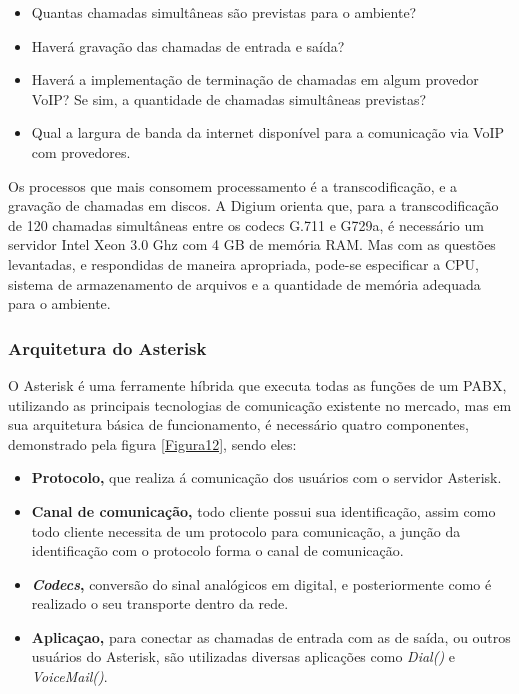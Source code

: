 \begin{itemize}
  \item Quantas chamadas simultâneas são previstas para o ambiente?
  \item Haverá gravação das chamadas de entrada e saída?
  \item Haverá a implementação de terminação de chamadas em algum provedor VoIP? Se sim, a quantidade de chamadas simultâneas previstas?
  \item Qual a largura de banda da internet disponível para a comunicação via VoIP com provedores.
\end{itemize}

Os processos que mais consomem processamento é a transcodificação, e a gravação de chamadas em discos. A Digium orienta que, para a transcodificação de 120 chamadas simultâneas entre os codecs G.711 e G729a, é necessário um servidor Intel Xeon 3.0 Ghz com 4 GB de memória RAM. Mas com as questões levantadas, e respondidas de maneira apropriada, pode-se especificar a CPU, sistema de armazenamento de arquivos e a quantidade de memória adequada para o ambiente. \cite{alexandrekeller2014}

\subsubsection{Arquitetura do Asterisk}
O Asterisk é uma ferramente híbrida que executa todas as funções de um PABX, utilizando as principais tecnologias de comunicação existente no mercado, mas em sua arquitetura básica de funcionamento, é necessário quatro componentes, demonstrado pela figura \ref{Figura12}, sendo eles: \cite{books/daglib/0018909}

\begin{itemize}
  \item \textbf{Protocolo,} que realiza á comunicação dos usuários com o servidor Asterisk.
  \item \textbf{Canal de comunicação,} todo cliente possui sua identificação, assim como todo cliente necessita de um protocolo para comunicação, a junção da identificação com o protocolo forma o canal de comunicação.
  \item \textbf{\textit{Codecs},} conversão do sinal analógicos em digital, e posteriormente como é realizado o seu transporte dentro da rede.
  \item \textbf{Aplicaçao,} para conectar as chamadas de entrada com as de saída, ou outros usuários do Asterisk, são utilizadas diversas aplicações como \textit{Dial()} e \textit{VoiceMail()}.
\end{itemize}

